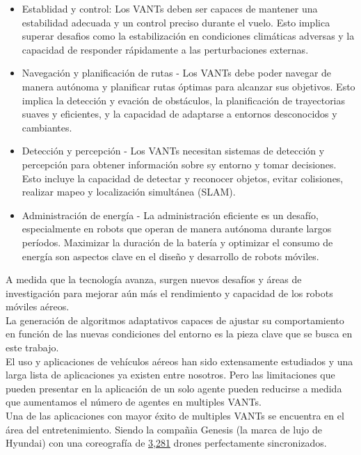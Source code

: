 \documentclass{article}
\begin{document}
\begin{itemize}
\item Establidad y control: Los VANTs deben ser capaces de mantener una estabilidad adecuada y un control preciso durante el vuelo. Esto implica superar desafios como la estabilización en condiciones climáticas adversas y la capacidad de responder rápidamente a las perturbaciones externas.
\item Navegación y planificación de rutas - Los VANTs debe poder navegar de manera autónoma y planificar rutas óptimas para alcanzar sus objetivos. Esto implica la detección y evación de obstáculos, la planificación de trayectorias suaves y eficientes, y la capacidad de adaptarse a entornos desconocidos y cambiantes.
\item Detección y percepción - Los VANTs necesitan sistemas de detección y percepción para obtener información sobre sy entorno y tomar decisiones. Esto incluye la capacidad de detectar y reconocer objetos, evitar colisiones, realizar mapeo y localización simultánea (SLAM).
\item Administración de energía - La administración eficiente es un desafío, especialmente en robots que operan de manera autónoma durante largos períodos. Maximizar la duración de la batería y optimizar el consumo de energía son aspectos clave en el diseño y desarrollo de robots móviles.
\end{itemize}

A medida que la tecnología avanza, surgen nuevos desafíos y áreas de investigación para mejorar aún más el rendimiento y capacidad de los robots móviles aéreos.\\

La generación de algoritmos adaptativos capaces de ajustar su comportamiento en función de las nuevas condiciones del entorno es la pieza clave que se busca en este trabajo.\\

El uso y aplicaciones de vehículos aéreos han sido extensamente estudiados y una larga lista de aplicaciones  ya existen entre nosotros. Pero las limitaciones que pueden presentar en la aplicación de un solo agente pueden reducirse a medida que aumentamos el número de agentes en multiples VANTs.\\

Una de las aplicaciones con mayor éxito de multiples VANTs se encuentra en el área del entretenimiento. Siendo la compañia Genesis (la marca de lujo de Hyundai) con una coreografía de \href{https://www.guinnessworldrecords.com/news/commercial/2021/5/3281-drones-break-dazzling-record-for-most-airborne-simultaneously-655062}{3,281} drones perfectamente sincronizados.\\
\end{document}
